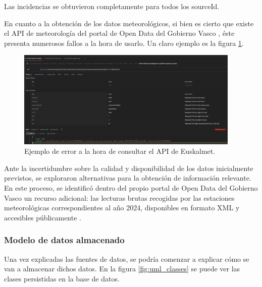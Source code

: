 Las incidencias se obtuvieron completamente para todos los sourceId.

En cuanto a la obtención de los datos meteorológicos, si bien es cierto que existe el API de meteorología del portal de Open Data del Gobierno Vasco \cite{apiMeteo}, éste presenta numerosos fallos a la hora de usarlo. Un claro ejemplo es la figura \ref{fig:euskalmet_api_error}. 

\begin{figure}[H]
	\centering
	\includegraphics[width=0.95\textwidth]{includes/error_api_euskalmet.png}
	\caption{Ejemplo de error a la hora de consultar el API de Euskalmet.}
	\label{fig:euskalmet_api_error}
\end{figure}

Ante la incertidumbre sobre la calidad y disponibilidad de los datos inicialmente previstos, se exploraron alternativas para la obtención de información relevante. En este proceso, se identificó dentro del propio portal de Open Data del Gobierno Vasco un recurso adicional: las lecturas brutas recogidas por las estaciones meteorológicas correspondientes al año 2024, disponibles en formato XML y accesibles públicamente \cite{xmlMeteo2024}.

\subsubsection*{Modelo de datos almacenado}

Una vez explicadas las fuentes de datos, se podría comenzar a explicar cómo se van a almacenar dichos datos. En la figura \ref{fig:uml_classes} se puede ver las clases persistidas en la base de datos.

